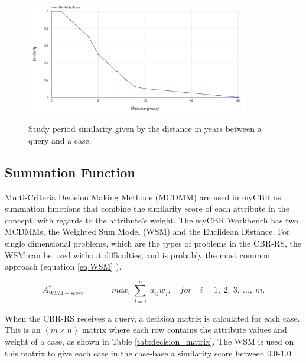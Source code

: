 \begin{figure}[h]
    \centering
    \caption[Study period similarity measure]{Study period similarity given by the distance in years between a query and a case.}
    \includegraphics[width=0.87\textwidth]{fig/study_period_graph.png}
    \label{fig:study_period_graph}
\end{figure}

\FloatBarrier

\subsection{Summation Function}

Multi-Criteria Decision Making Methods (MCDMM) are used in myCBR as summation functions that combine the similarity score of each attribute in the concept, with regards to the attribute's weight. The myCBR Workbench has two MCDMMs, the Weighted Sum Model (WSM) and the Euclidean Distance. For single dimensional problems, which are the types of problems in the CBR-RS, the WSM can be used without difficulties, and is probably the most common approach \cite{triantaphyllou2000multi} (equation \ref{eq:WSM} \cite{fishburn1967letter}).

\begin{equation} \label{eq:WSM}
    A^{*}_{WSM-score}\quad =\quad max_{i}\  \sum\limits_{j = 1}^{n}\  a_{ij}w_{j},\quad for \quad i =1,\ 2,\ 3,\ ...,\ m.
\end{equation}

When the CBR-RS receives a query, a decision matrix is calculated for each case. This is an $(m \times n)$ matrix where each row contains the attribute values and weight of a case, as shown in Table \ref{tab:decision_matrix}. The WSM is used on this matrix to give each case in the case-base a similarity score between 0.0-1.0.


